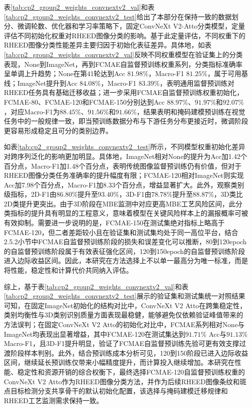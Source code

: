 表\ref{tab:cp2_group2_weights_convnextv2_val}和表\ref{tab:cp2_group2_weights_convnextv2_test}给出了本部分在保持一致的数据划分、微调轮数、优化器和学习率策略下，固定ConvNeXt V2-Atto分类模型，定量评估不同初始化权重对RHEED图像分类的影响。基于此定量评估，不同权重下的RHEED图像分类性能差异主要归因于初始化表征差异。具体地，如表\ref{tab:cp2_group2_weights_convnextv2_val}反映不同权重模型在验证集上的分类表现，None到ImageNet，再到FCMAE自监督预训练权重系列，分类指标准确率呈单调上升趋势；None在第41轮达到Acc $81.98\%$，Macro-F1 $81.25\%$，属于可用基线；ImageNet提升到Acc $84.08\%$，Macro-F1 $83.39\%$，表明通用监督预训练对RHEED任务具有基础迁移收益；进一步采用FCMAE自监督预训练权重初始化，FCMAE-80、FCMAE-120和FCMAE-150分别达到Acc $88.97\%$、$91.97\%$和$92.07\%$，对应Macro-F1为$88.45\%$、$91.56\%$和$91.66\%$，结果表明和掩码建模预训练在视觉任务中的一般规律一致，即当预训练数据分布与下游任务分布更接近时，微调阶段更容易形成稳定且可分的类别边界。

如表\ref{tab:cp2_group2_weights_convnextv2_test}所示，不同模型权重初始化差异对跨序列泛化的影响更加明显。具体地，ImageNet相对None的提升为Acc加1.42个百分点，Macro-F1加1.48个百分点，表明传统图像监督预训练仍有价值，但对于RHEED图像分类任务准确率的提升幅度有限；FCMAE-120相对ImageNet则实现Acc加7.98个百分点，Macro-F1加8.33个百分点，增益显著扩大。此外，观察类别级指标，2D-F1由$86.80\%$提升至$93.40\%$，3D-F1由$78.78\%$提升至$88.87\%$，3D类比2D类提升更突出。由于3D阶段在MBE监测中对应更高MBE工艺风险区间，此分类指标的提升具有明显的工程意义，意味着模型在关键风险样本上的漏报概率可被有效抑制。需要进一步说明的是，FCMAE-150在测试集绝对指标上略高于FCMAE-120，但二者差距较小且在验证集和测试集均处于同一高位平台，结合2.5.2小节中FCMAE自监督预训练阶段的损失和误差变化可以推断，80到120epoch的自监督预训练阶段属于有效表征强化区间，120到150epoch的自监督预训练阶段进入边际收益区间。因此，本研究在方法选择上不以单一最高分为唯一标准，而是将性能，稳定性和计算代价共同纳入评估。

综上，基于表\ref{tab:cp2_group2_weights_convnextv2_val}和表\ref{tab:cp2_group2_weights_convnextv2_test}展示的验证集和测试集统一对照结果可知，在固定ImageNet初始化的结构对比中，ConvNeXt V2 Atto在跨集稳定性，类别均衡性与3D类别识别质量方面表现最稳健，能够避免仅依赖验证峰值带来的方法误判；在固定ConvNeXt V2 Atto的初始化对比中，FCMAE系列相对None与ImageNet均表现出显著增益，其中FCMAE-120在测试集达到$91.71\%$ Acc与$91.13\%$ Macro-F1，且3D-F1提升明显，验证了FCMAE自监督预训练先验可更有效支撑过渡阶段样本判别。此外，结合预训练成本分析可见，120到150阶段已进入边际收益区间，继续延长预训练仅带来小幅精度提升，而计算投入继续增加。本研究在性能、稳定性和资源开销的综合权衡下，最终选择FCMAE-120自监督预训练权重的ConvNeXt V2 Atto作为RHEED图像分类方法，并作为后续RHEED图像条纹和斑点目标检测分支共享骨干的默认初始化配置，该选择与掩码建模迁移规律和RHEED工艺监测需求保持一致。

